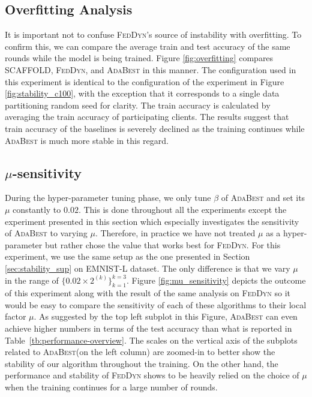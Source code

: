 \documentclass[runningheads]{llncs}
\def\tableref#1{Table~\ref{#1}}
\newcommand{\scaffold}{\textsc{SCAFFOLD}\xspace}
\newcommand{\feddyn}{\textsc{FedDyn}\xspace}
\newcommand{\ours}{\textsc{AdaBest}\xspace}
\def\emnist{{\textsc{EMNIST-L}}}
\begin{document}
\subsection{Overfitting Analysis}
It is important not to confuse \feddyn's source of instability with overfitting. To confirm this, we can compare the average train and test accuracy of the same rounds while the model is being trained. Figure \ref{fig:overfitting} compares \scaffold, \feddyn, and \ours in this manner. The configuration used in this experiment is identical to the configuration of the experiment in Figure \ref{fig:stability_c100}, with the exception that it corresponds to a single data partitioning random seed for clarity. The train accuracy is calculated by averaging the train accuracy of participating clients. The results suggest that train accuracy of the baselines is severely declined as the training continues while \ours is much more stable in this regard.


\subsection{$\mu$-sensitivity}

During the hyper-parameter tuning phase, we only tune $\beta$ of \ours and set its $\mu$ constantly to $0.02$. This is done throughout all the experiments except the experiment presented in this section which especially investigates the sensitivity of \ours to varying $\mu$. Therefore, in practice we have not treated $\mu$ as a hyper-parameter but rather chose the value that works best for \feddyn. For this experiment, we use the same setup as the one presented in Section \ref{sec:stability_sup} on \emnist{} dataset. The only difference is that we vary $\mu$ in the range of $\{0.02\times 2^{(k)}\}_{k=1}^{k=3}$. Figure \ref{fig:mu_sensitivity} depicts the outcome of this experiment along with the result of the same analysis on \feddyn so it would be easy to compare the sensitivity of each of these algorithms to their local factor $\mu$. As suggested by the top left subplot in this Figure, \ours can even achieve higher numbers in terms of the test accuracy than what is reported in \tableref{tb:performance-overview}. The scales on the vertical axis of the subplots related to \ours (on the left column) are zoomed-in to better show the stability of our algorithm throughout the training. On the other hand, the performance and stability of \feddyn shows to be heavily relied on the choice of $\mu$ when the training continues for a large number of rounds. 
\end{document}
